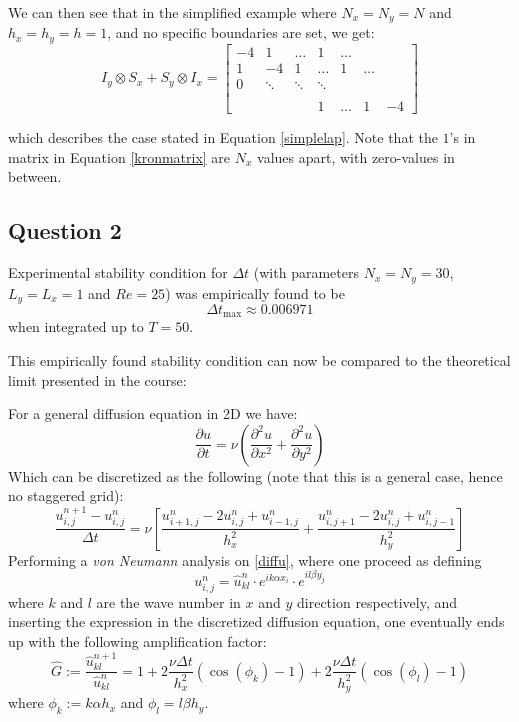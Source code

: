 \documentclass[10pt]{report}
\newcommand{\dt}{\Delta t}
\newcommand{\p}{\partial}
\begin{document}
We can then see that in the simplified example where $N_x = N_y = N$ and $h_x = h_y = h = 1$, and no specific boundaries are set, we get:
\begin{equation}
    I_y \otimes S_x + S_y \otimes I_x = \begin{bmatrix}
        -4&1&\hdots&1&\hdots\\
        1&-4&1&\hdots&1&\hdots\\
        0 &\ddots&\ddots &\ddots \\\\
        &&&1&\hdots&1&-4
    \end{bmatrix} \label{kronmatrix}
\end{equation}

which describes the case stated in Equation \ref{simplelap}. Note that the $1$'s in matrix in Equation \ref{kronmatrix} are $N_x$ 
values apart, with zero-values in between.
\subsection*{Question 2}
Experimental stability condition for $\Delta t$ 
(with parameters $N_x = N_y = 30$, $L_y = L_x = 1$ and $Re = 25$) was empirically found to be
\[
\Delta t_{\text{max}} \approx 0.006971
\]
when integrated up to $T = 50$.

This empirically found stability condition can now be compared to the theoretical limit presented in the course:

For a general diffusion equation in 2D we have:
\begin{equation*}
    \frac{\p u}{\p t} = \nu \left(\frac{\p^2 u}{\p x^2}+ \frac{\p^2 u}{\p y^2}\right)
\end{equation*}
Which can be discretized as the following (note that this is a general case, hence no staggered grid):
\begin{equation}
    \frac{u^{n+1}_{i,j}-u^{n}_{i,j}}{\dt} = \nu \left[\frac{u^n_{i+1,j}-2u^n_{i,j}+u^n_{i-1,j}}{h_x^2} 
    + \frac{u^n_{i,j+1}-2u^n_{i,j}+u^n_{i,j-1}}{h_y^2} \right] \label{diffu}
\end{equation}
Performing a \textit{von Neumann} analysis on \ref{diffu}, where one proceed as defining 
\[u_{i,j}^n = \hat{u}^n_{kl}\cdot e^{ik\alpha x_i}\cdot e^{il\beta y_j}\] 
where $k$ and $l$ are the wave number in $x$ and $y$
direction respectively, and inserting the expression in the discretized diffusion equation, 
one eventually ends up with the following
amplification factor:
\begin{equation}
    \hat{G} := \frac{\hat{u}^{n+1}_{kl}}{\hat{u}^n_{kl}} = 1+2\frac{\nu \dt}{h_x^2}(\cos(\phi_k)-1)
    +2\frac{\nu \dt}{h_y^2}(\cos(\phi_l) -1)
\end{equation}
where $\phi_k := k\alpha h_x$ and $\phi_l = l\beta h_y$.
\end{document}
